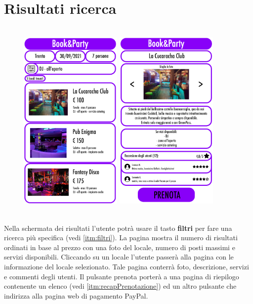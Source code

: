 \newpage
\section{Risultati ricerca}
\begin{figure}[h]
    \centering
    \includegraphics[width=5cm, height=10cm]{mockup/05-ricerche-filtri.jpg}
    \qquad\qquad
    \includegraphics[width=5cm, height=10cm]{mockup/06-ricerca.jpg}
    \label{fig:risultati}
\end{figure}

Nella schermata dei risultati l'utente potrà usare il tasto \textbf{filtri} per fare una 
ricerca più specifica (vedi \ref{itm:filtri}). La pagina mostra il numero di risultati
ordinati in base al prezzo con una foto del locale, numero di posti massimi e servizi 
disponibili.
Cliccando su un locale l'utente passerà alla pagina con le informazione del locale 
selezionato.
Tale pagina conterrà foto, descrizione, servizi e commenti degli utenti. Il pulsante 
prenota porterà a una pagina di riepilogo contenente un elenco (vedi 
\ref{itm:recapPrenotazione}) ed un altro pulsante che indirizza alla pagina web di pagamento 
PayPal.

